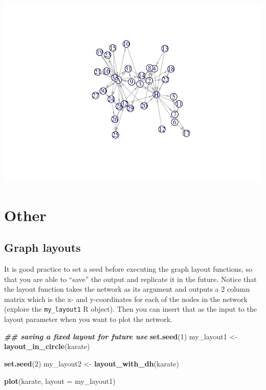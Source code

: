 \documentclass[
]{book}
\newenvironment{Shaded}{\begin{snugshade}}{\end{snugshade}}
\newcommand{\AttributeTok}[1]{\textcolor[rgb]{0.13,0.29,0.53}{#1}}
\newcommand{\DecValTok}[1]{\textcolor[rgb]{0.00,0.00,0.81}{#1}}
\newcommand{\DocumentationTok}[1]{\textcolor[rgb]{0.56,0.35,0.01}{\textbf{\textit{#1}}}}
\newcommand{\FunctionTok}[1]{\textcolor[rgb]{0.13,0.29,0.53}{\textbf{#1}}}
\newcommand{\NormalTok}[1]{#1}
\newcommand{\OtherTok}[1]{\textcolor[rgb]{0.56,0.35,0.01}{#1}}
\begin{document}
\includegraphics{bookdown-demo_files/figure-latex/unnamed-chunk-134-1.pdf}

\section{Other}\label{other}

\subsection{Graph layouts}\label{graph-layouts}

It is good practice to set a seed before executing the graph layout functions, so that you are able to ``save'' the output and replicate it in the future. Notice that the layout function takes the network as its argument and outputs a 2 column matrix which is the x- and y-coordinates for each of the nodes in the network (explore the \texttt{my\_layout1} R object). Then you can insert that as the input to the layout parameter when you want to plot the network.

\begin{Shaded}
\begin{Highlighting}[]
\DocumentationTok{\#\# saving a fixed layout for future use }
\FunctionTok{set.seed}\NormalTok{(}\DecValTok{1}\NormalTok{)}
\NormalTok{my\_layout1 }\OtherTok{\textless{}{-}} \FunctionTok{layout\_in\_circle}\NormalTok{(karate)}

\FunctionTok{set.seed}\NormalTok{(}\DecValTok{2}\NormalTok{)}
\NormalTok{my\_layout2 }\OtherTok{\textless{}{-}} \FunctionTok{layout\_with\_dh}\NormalTok{(karate)}

\FunctionTok{plot}\NormalTok{(karate, }\AttributeTok{layout =}\NormalTok{ my\_layout1)}
\end{Highlighting}
\end{Shaded}
\end{document}
